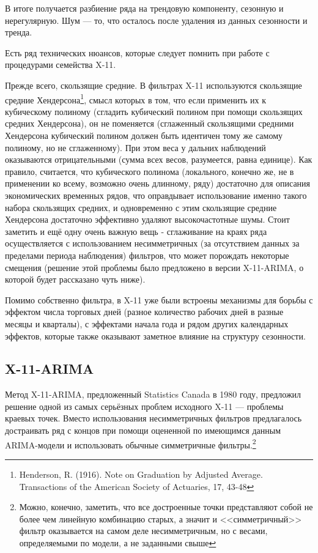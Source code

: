 \documentclass[final,pdftex]{../../template/epsilonj}\usepackage[]{graphicx}\usepackage[]{color}
\begin{document}
В итоге получается разбиение ряда на трендовую компоненту, сезонную и нерегулярную. Шум --- то, что осталось после удаления из данных сезонности и тренда. 

Есть ряд технических нюансов, которые следует помнить при работе с процедурами семейства X-11. 

Прежде всего, скользящие средние. В фильтрах X-11 используются скользящие средние Хендерсона\footnote{Henderson, R. (1916). Note on Graduation by Adjusted Average. Transactions of the American Society of Actuaries, 17, 43-48}, смысл которых в том, что если применить их к кубическому полиному (сгладить кубический полином при помощи скользящих средних Хендерсона), он не поменяется (сглаженный скользящими средними Хендерсона кубический полином должен быть идентичен тому же самому полиному, но не сглаженному). При этом веса у дальних наблюдений оказываются отрицательными (сумма всех весов, разумеется, равна единице). Как правило, считается, что кубического полинома (локального, конечно же, не в применении ко всему, возможно очень длинному, ряду) достаточно для описания экономических временных рядов, что оправдывает использование именно такого набора скользящих средних, и одновременно с этим скользящие средние Хендерсона достаточно эффективно удаляют высокочастотные шумы. 
Стоит заметить и ещё одну очень важную вещь - сглаживание на краях ряда осуществляется с использованием несимметричных (за отсутствием данных за пределами периода наблюдения) фильтров, что может порождать некоторые смещения (решение этой проблемы было предложено в версии X-11-ARIMA, о которой будет рассказано чуть ниже). 

Помимо собственно фильтра, в X-11 уже были встроены механизмы для борьбы с эффектом числа торговых дней (разное количество рабочих дней в разные месяцы и кварталы), с эффектами начала года и рядом других календарных эффектов, которые также оказывают заметное влияние на структуру сезонности. 

\subsection{X-11-ARIMA}

Метод X-11-ARIMA, предложенный Statistics Canada в 1980 году, предложил решение одной из самых серьёзных проблем исходного X-11 --- проблемы краевых точек. Вместо использования несимметричных фильтров предлагалось достраивать ряд с концов при помощи оцененной по имеющимся данным ARIMA-модели и использовать обычные симметричные фильтры.\footnote{Можно, конечно, заметить, что все достроенные точки представляют собой не более чем линейную комбинацию старых, а значит и <<симметричный>> фильтр оказывается на самом деле несимметричным, но с весами, определяемыми по модели, а не заданными свыше} 
\end{document}
